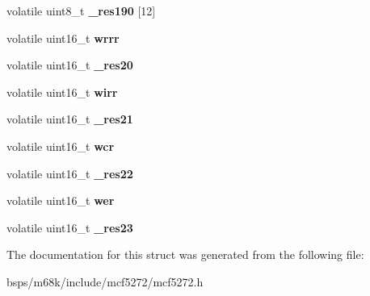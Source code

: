 \begin{DoxyCompactItemize}
volatile uint8\+\_\+t {\bfseries \+\_\+res190} \mbox{[}12\mbox{]}
\item 
\mbox{\label{structtimer__regs__t_a2d81402204a99a229422119c9b9ebad4}} 
volatile uint16\+\_\+t {\bfseries wrrr}
\item 
\mbox{\label{structtimer__regs__t_a59c3299007a48f61a333b3d57daf8333}} 
volatile uint16\+\_\+t {\bfseries \+\_\+res20}
\item 
\mbox{\label{structtimer__regs__t_a7aadeee03712c2823e10f9bfe4563d94}} 
volatile uint16\+\_\+t {\bfseries wirr}
\item 
\mbox{\label{structtimer__regs__t_a658ffc9f3e6ffa1374e3a0743e2e9d15}} 
volatile uint16\+\_\+t {\bfseries \+\_\+res21}
\item 
\mbox{\label{structtimer__regs__t_a681cd7ad3bae099fa2929616bcf781ca}} 
volatile uint16\+\_\+t {\bfseries wcr}
\item 
\mbox{\label{structtimer__regs__t_a8e7eb38f1d264c21a9f35d0d00778833}} 
volatile uint16\+\_\+t {\bfseries \+\_\+res22}
\item 
\mbox{\label{structtimer__regs__t_ad1f53e94ec9b7372e18f236b2ebbeffc}} 
volatile uint16\+\_\+t {\bfseries wer}
\item 
\mbox{\label{structtimer__regs__t_aa80ad7e9ca96012c78aaf820085f5459}} 
volatile uint16\+\_\+t {\bfseries \+\_\+res23}
\end{DoxyCompactItemize}


The documentation for this struct was generated from the following file\+:\begin{DoxyCompactItemize}
\item 
bsps/m68k/include/mcf5272/mcf5272.\+h\end{DoxyCompactItemize}
